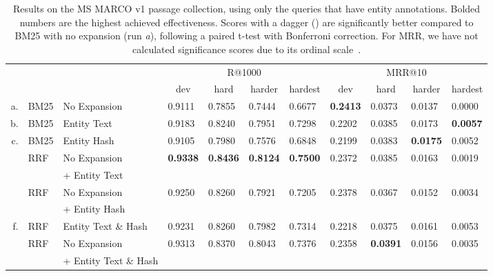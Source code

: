 \begin{table}
	\centering
	\caption{Results on the MS MARCO v1 passage collection, using only the queries that have entity annotations. Bolded numbers are the highest achieved effectiveness. Scores with a dagger (\dag) are significantly better compared to BM25 with no expansion (run \emph{a}), following a paired t-test with Bonferroni correction. For MRR, we have not calculated significance scores due to its ordinal scale~\citep{fuhr-mrr}.}
	\tabcolsep=0.11cm
	\begin{tabular}{rll|llll|llll}
		\toprule
		\multirow{2}{*}{}
		& & & \multicolumn{4}{c|}{R@1000} & \multicolumn{4}{c}{MRR@10} \\
		& & & \multicolumn{1}{c}{dev} & \multicolumn{1}{c}{hard} & \multicolumn{1}{c}{harder} & \multicolumn{1}{c|}{hardest} & \multicolumn{1}{c}{dev} & \multicolumn{1}{c}{hard} & \multicolumn{1}{c}{harder} & \multicolumn{1}{c}{hardest} \\
		\midrule
		a. & BM25 & No Expansion                       & 0.9111 & 0.7855 & 0.7444 & 0.6677 & \textbf{0.2413} & 0.0373 & 0.0137 & 0.0000 \\
		b. & BM25 & Entity Text                        & 0.9183 & 0.8240\dag & 0.7951\dag & 0.7298\dag & 0.2202 & 0.0385 & 0.0173 & \textbf{0.0057} \\
		c. & BM25 & Entity Hash                        & 0.9105 & 0.7980 & 0.7576 & 0.6848 & 0.2199 & 0.0383 & \textbf{0.0175} & 0.0052 \\ \midrule
		\multirow{2}{*}{}
		d. & RRF & No Expansion          & \textbf{0.9338}\dag & \textbf{0.8436}\dag & \textbf{0.8124}\dag & \textbf{0.7500}\dag & 0.2372 & 0.0385 & 0.0163 & 0.0019 \\
		& & + Entity Text &&&&&&&& \\
		\multirow{2}{*}{}
		e. & RRF &  No Expansion     & 0.9250\dag & 0.8260\dag & 0.7921\dag & 0.7205\dag & 0.2378 & 0.0367 & 0.0152 & 0.0034 \\
		&&  + Entity Hash  &&&&&&&& \\
		f. & RRF & Entity Text \& Hash                 & 0.9231 & 0.8260\dag & 0.7982\dag & 0.7314\dag & 0.2218 & 0.0375 & 0.0161 & 0.0053 \\
		\multirow{2}{*}{}
		g. & RRF & No Expansion   & 0.9313\dag & 0.8370\dag & 0.8043\dag & 0.7376\dag & 0.2358 & \textbf{0.0391} & 0.0156 & 0.0035 \\
		&& + Entity Text \& Hash &&&&&&&& \\
		\bottomrule 
	\end{tabular}
	\label{tab:results-table}
\end{table}

